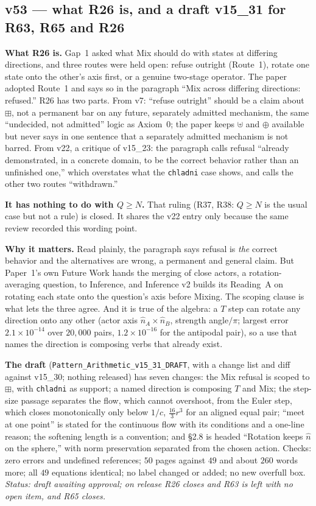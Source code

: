 \documentclass[11pt]{article}
\begin{document}
\subsection*{v53 --- what R26 is, and a draft v15\_31 for R63, R65 and R26}
\textbf{What R26 is.} Gap~1 asked what Mix should do with states at differing directions, and three routes were held open: refuse outright (Route~1), rotate one state onto the other's axis first, or a genuine two-stage operator. The paper adopted Route~1 and says so in the paragraph
``Mix across differing directions: refused.'' R26 has two parts. From v7: ``refuse outright'' should be a claim about $\boxplus$, not a permanent bar on any future, separately admitted mechanism, the same ``undecided, not admitted'' logic as Axiom~0; the paper keeps $\uplus$ and $\oplus$ available but never says in one sentence that a separately admitted mechanism is not barred.
From v22, a critique of v15\_23: the paragraph calls refusal ``already demonstrated, in a concrete domain, to be the correct behavior rather than an unfinished one,'' which overstates what the \texttt{chladni} case shows, and calls the other two routes ``withdrawn.''

\textbf{It has nothing to do with $Q\ge N$.} That ruling (R37, R38: $Q\ge N$ is the usual case but not a rule) is closed. It shares the v22 entry only because the same review recorded this wording point.

\textbf{Why it matters.} Read plainly, the paragraph says refusal is \emph{the} correct behavior and the alternatives are wrong, a permanent and general claim. But Paper~1's own Future Work hands the merging of close actors, a rotation-averaging question, to Inference, and Inference v2 builds its Reading~A on rotating each state onto the question's axis before Mixing.
The scoping clause is what lets the three agree. And it is true of the algebra: a $T$ step can rotate any direction onto any other (actor axis $\hat n_A\times\hat n_B$, strength angle$/\pi$; largest error $2.1\times10^{-14}$ over $20{,}000$ pairs, $1.2\times10^{-16}$ for the antipodal pair), so a use that names the direction is composing verbs that already exist.

\textbf{The draft} (\texttt{Pattern\_Arithmetic\_v15\_31\_DRAFT}, with a change list and diff against v15\_30; nothing released) has seven changes: the Mix refusal is scoped to $\boxplus$, with \texttt{chladni} as support; a named direction is composing $T$ and Mix; the step-size passage separates the flow, which cannot overshoot, from the Euler step, which closes monotonically only below $1/c$, $\tfrac{16}{3}r^3$ for an aligned equal pair;
``meet at one point'' is stated for the continuous flow with its conditions and a one-line reason; the softening length is a convention; and \S2.8 is headed ``Rotation keeps $\hat n$ on the sphere,'' with norm preservation separated from the chosen action.
Checks: zero errors and undefined references; $50$ pages against $49$ and about $260$ words more; all $49$ equations identical; no label changed or added; no new overfull box.
\emph{Status: draft awaiting approval; on release R26 closes and R63 is left with no open item, and R65 closes.}
\end{document}
